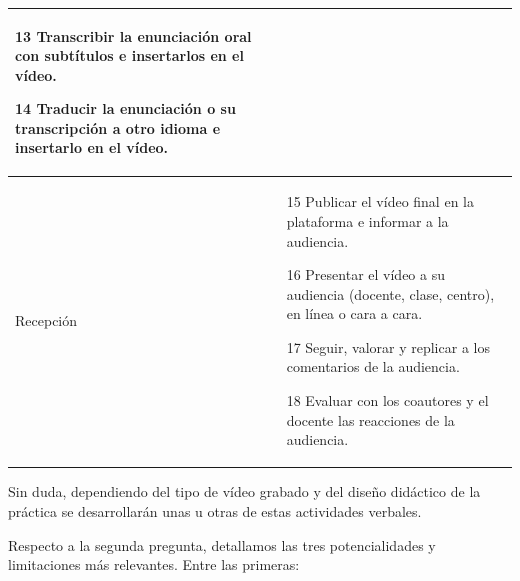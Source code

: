 \documentclass[spanish]{textolivre}
\begin{document}
\begin{table}[htbp]
\begin{tabular}{p{2cm} p{12cm}}
 13 Transcribir la enunciación oral con subtítulos e insertarlos en el vídeo.
 
 14 Traducir la enunciación o su transcripción a otro idioma e insertarlo en el vídeo. \\
\midrule
Recepción & 15 Publicar el vídeo final en la plataforma e informar a la audiencia.

 16 Presentar el vídeo a su audiencia (docente, clase, centro), en línea o cara a cara.
 
 17 Seguir, valorar y replicar a los comentarios de la audiencia.
 
 18 Evaluar con los coautores y el docente las reacciones de la audiencia. \\
\bottomrule
\end{tabular}
\end{table}

Sin duda, dependiendo del tipo de vídeo grabado y del diseño didáctico de la práctica se desarrollarán unas u otras de estas actividades verbales.

Respecto a la segunda pregunta, detallamos las tres potencialidades y limitaciones más relevantes. Entre las primeras:
\end{document}
